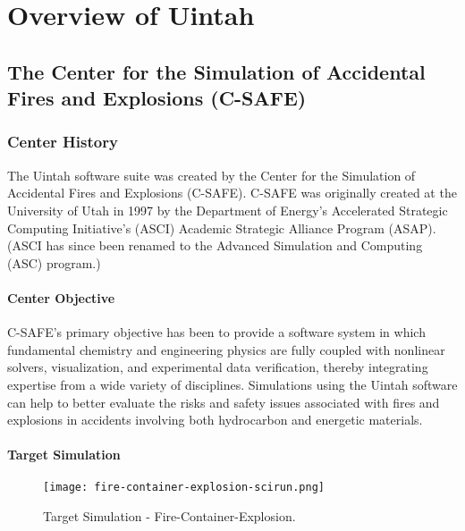 \chapter{Overview of Uintah} \label{Sec:Overview} 

\section{The Center for the Simulation of Accidental Fires and Explosions (C-SAFE)}

\subsection{Center History}

The Uintah software suite was created by the Center for the Simulation
of Accidental Fires and Explosions (C-SAFE).  C-SAFE was originally
created at the University of Utah in 1997 by the Department of
Energy's Accelerated Strategic Computing Initiative's (ASCI) Academic
Strategic Alliance Program (ASAP).  (ASCI has since been renamed to
the Advanced Simulation and Computing (ASC) program.)

\subsubsection{Center Objective}

C-SAFE's primary objective has been to provide a software system in
which fundamental chemistry and engineering physics are fully coupled
with nonlinear solvers, visualization, and experimental data
verification, thereby integrating expertise from a wide variety of
disciplines. Simulations using the Uintah software can help to better
evaluate the risks and safety issues associated with fires and
explosions in accidents involving both hydrocarbon and energetic
materials.

\subsubsection{Target Simulation}

\begin{figure}
  \texttt{[image: fire-container-explosion-scirun.png]}
  \caption{Target Simulation - Fire-Container-Explosion.}
  \label{Fig:fire-container-explosion}
\end{figure}

